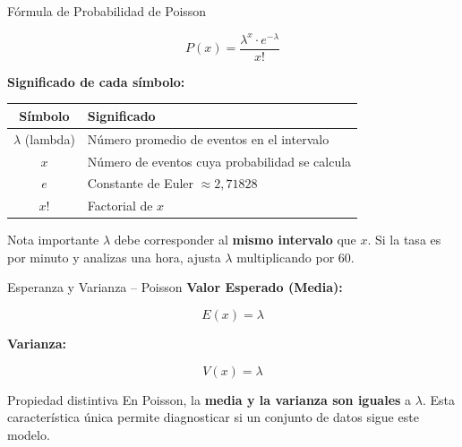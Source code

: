 \documentclass[10pt]{beamer}
\begin{document}
\begin{frame}{Fórmula de Probabilidad de Poisson}
\begin{center}
\Large
\[
P(x) = \frac{\lambda^{x} \cdot e^{-\lambda}}{x!}
\]
\end{center}

\vspace{0.3cm}
\textbf{Significado de cada símbolo:}
\vspace{0.2cm}

\begin{table}
\centering
\begin{tabular}{@{}cl@{}}
\toprule
\textbf{Símbolo} & \textbf{Significado} \\
\midrule
\textcolor{celesteoscuro}{\textbf{$\lambda$}} (lambda) & Número promedio de eventos en el intervalo \\
\textcolor{celesteoscuro}{\textbf{$x$}} & Número de eventos cuya probabilidad se calcula \\
\textcolor{celesteoscuro}{\textbf{$e$}} & Constante de Euler $\approx 2,71828$ \\
\textcolor{celesteoscuro}{\textbf{$x!$}} & Factorial de $x$ \\
\bottomrule
\end{tabular}
\end{table}

\vspace{0.2cm}
\begin{alertblock}{Nota importante}
$\lambda$ debe corresponder al \textbf{mismo intervalo} que $x$. Si la tasa es por minuto y analizas una hora, ajusta $\lambda$ multiplicando por 60.
\end{alertblock}
\end{frame}

\begin{frame}{Esperanza y Varianza -- Poisson}
\justifying
\textbf{Valor Esperado (Media):}
\begin{center}
\Large
\[
E(x) = \lambda
\]
\end{center}

\vspace{0.3cm}
\justifying
\textbf{Varianza:}
\begin{center}
\Large
\[
V(x) = \lambda
\]
\end{center}

\vspace{0.3cm}
\begin{exampleblock}{Propiedad distintiva}
En Poisson, la \textbf{media y la varianza son iguales} a $\lambda$. Esta característica única permite diagnosticar si un conjunto de datos sigue este modelo.
\end{exampleblock}
\end{frame}
\end{document}
